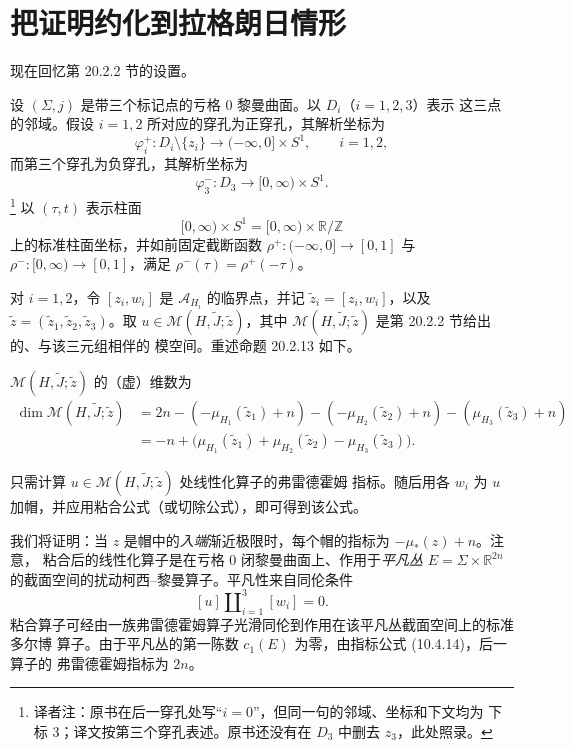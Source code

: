 \section{把证明约化到拉格朗日情形}
\label{sec:app-c-reduction-lagrangian}

现在回忆第 20.2.2 节的设置。

设 $(\Sigma,j)$ 是带三个标记点的亏格 $0$ 黎曼曲面。以 $D_i$（$i=1,2,3$）表示
这三点的邻域。假设 $i=1,2$ 所对应的穿孔为正穿孔，其解析坐标为
\[
 \varphi_i^+\colon D_i\setminus\{z_i\}
 \longrightarrow(-\infty,0]\times S^1,
 \qquad i=1,2,
\]
而第三个穿孔为负穿孔，其解析坐标为
\[
 \varphi_3^-\colon D_3\longrightarrow[0,\infty)\times S^1.
\]
\footnote{译者注：原书在后一穿孔处写“$i=0$”，但同一句的邻域、坐标和下文均为
下标 $3$；译文按第三个穿孔表述。原书还没有在 $D_3$ 中删去 $z_3$，此处照录。}
以 $(\tau,t)$ 表示柱面
\[
 [0,\infty)\times S^1=[0,\infty)\times\mathbb R/\mathbb Z
\]
上的标准柱面坐标，并如前固定截断函数
$\rho^+\colon(-\infty,0]\to[0,1]$ 与
$\rho^-\colon[0,\infty)\to[0,1]$，满足
$\rho^-(\tau)=\rho^+(-\tau)$。

对 $i=1,2$，令 $[z_i,w_i]$ 是 $\mathcal A_{H_i}$ 的临界点，并记
$\widetilde z_i=[z_i,w_i]$，以及
$\widetilde z=(\widetilde z_1,\widetilde z_2,\widetilde z_3)$。取
$u\in\mathcal M(H,\widetilde J;\widetilde z)$，其中
$\mathcal M(H,\widetilde J;\widetilde z)$ 是第 20.2.2 节给出的、与该三元组相伴的
模空间。重述命题 20.2.13 如下。

\begin{proposition}
\label{prop:app-c-pants-dimension}
$\mathcal M(H,\widetilde J;\widetilde z)$ 的（虚）维数为
\begin{align*}
 \dim\mathcal M(H,\widetilde J;\widetilde z)
 &=2n-(-\mu_{H_1}(\widetilde z_1)+n)
       -(-\mu_{H_2}(\widetilde z_2)+n)
       -(\mu_{H_3}(\widetilde z_3)+n)\\
 &=-n+\bigl(\mu_{H_1}(\widetilde z_1)
            +\mu_{H_2}(\widetilde z_2)
            -\mu_{H_3}(\widetilde z_3)\bigr).
\end{align*}
\end{proposition}

只需计算 $u\in\mathcal M(H,\widetilde J;\widetilde z)$ 处线性化算子的弗雷德霍姆
指标。随后用各 $w_i$ 为 $u$ 加帽，并应用粘合公式（或切除公式），即可得到该公式。

我们将证明：当 $z$ 是帽中的\emph{入端}渐近极限时，每个帽的指标为 $-\mu_*(z)+n$。注意，
粘合后的线性化算子是在亏格 $0$ 闭黎曼曲面上、作用于\emph{平凡丛}
$E=\Sigma\times\mathbb R^{2n}$ 的截面空间的扰动柯西--黎曼算子。平凡性来自同伦条件
\[
 [u]\amalg_{i=1}^3[w_i]=0.
\]
粘合算子可经由一族弗雷德霍姆算子光滑同伦到作用在该平凡丛截面空间上的标准多尔博
算子。由于平凡丛的第一陈数 $c_1(E)$ 为零，由指标公式 (10.4.14)，后一算子的
弗雷德霍姆指标为 $2n$。

